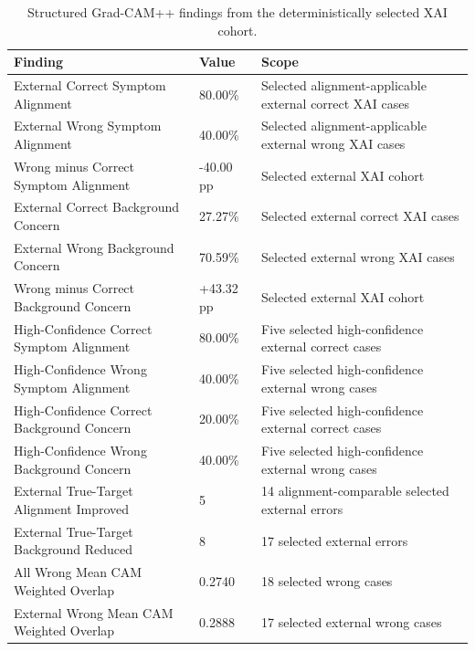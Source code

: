 \begin{table}
\caption{Structured Grad-CAM++ findings from the deterministically selected XAI cohort.}
\label{tab:xai_findings}
\begin{tabular}{lll}
\toprule
Finding & Value & Scope \\
\midrule
External Correct Symptom Alignment & 80.00\% & Selected alignment-applicable external correct XAI cases \\
External Wrong Symptom Alignment & 40.00\% & Selected alignment-applicable external wrong XAI cases \\
Wrong minus Correct Symptom Alignment & -40.00 pp & Selected external XAI cohort \\
External Correct Background Concern & 27.27\% & Selected external correct XAI cases \\
External Wrong Background Concern & 70.59\% & Selected external wrong XAI cases \\
Wrong minus Correct Background Concern & +43.32 pp & Selected external XAI cohort \\
High-Confidence Correct Symptom Alignment & 80.00\% & Five selected high-confidence external correct cases \\
High-Confidence Wrong Symptom Alignment & 40.00\% & Five selected high-confidence external wrong cases \\
High-Confidence Correct Background Concern & 20.00\% & Five selected high-confidence external correct cases \\
High-Confidence Wrong Background Concern & 40.00\% & Five selected high-confidence external wrong cases \\
External True-Target Alignment Improved & 5 & 14 alignment-comparable selected external errors \\
External True-Target Background Reduced & 8 & 17 selected external errors \\
All Wrong Mean CAM Weighted Overlap & 0.2740 & 18 selected wrong cases \\
External Wrong Mean CAM Weighted Overlap & 0.2888 & 17 selected external wrong cases \\
\bottomrule
\end{tabular}
\end{table}
